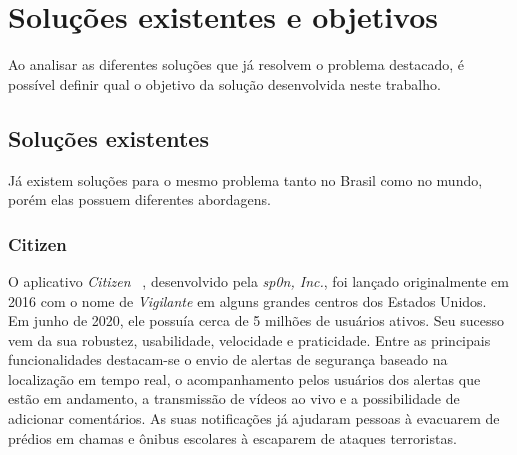 \chapter{Soluções existentes e objetivos}
\label{c.solucoes-existentes-e-objetivos}



Ao analisar as diferentes soluções que já resolvem o problema destacado, é possível definir qual o objetivo da solução desenvolvida neste trabalho.

\section{Soluções existentes}

Já existem soluções para o mesmo problema tanto no Brasil como no mundo, porém elas possuem diferentes abordagens.


\subsection{Citizen}

O aplicativo \emph{Citizen} ~\cite{citizen}, desenvolvido pela \emph{sp0n, Inc.}, foi lançado originalmente em 2016 com o nome de \emph{Vigilante} em alguns grandes centros dos Estados Unidos. Em junho de 2020, ele possuía cerca de 5 milhões de usuários ativos. Seu sucesso vem da sua robustez, usabilidade, velocidade e praticidade. Entre as principais funcionalidades destacam-se o envio de alertas de segurança baseado na localização em tempo real, o acompanhamento pelos usuários dos alertas que estão em andamento, a transmissão de vídeos ao vivo e a possibilidade de adicionar comentários. As suas notificações já ajudaram pessoas à evacuarem de prédios em chamas e ônibus escolares à escaparem de ataques terroristas. 

